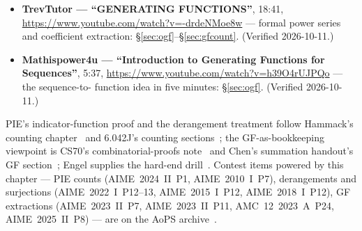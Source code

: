 \begin{rulebox}
\begin{itemize}
\item \textbf{TrevTutor --- ``GENERATING FUNCTIONS''}, 18:41,
\url{https://www.youtube.com/watch?v=-drdeNMoe8w} --- formal power
series and coefficient extraction: \S\ref{sec:ogf}--\S\ref{sec:gfcount}.
(Verified 2026-10-11.)
\item \textbf{Mathispower4u --- ``Introduction to Generating Functions
for Sequences''}, 5:37,
\url{https://www.youtube.com/watch?v=h39O4rUJPQo} --- the sequence-to-
function idea in five minutes: \S\ref{sec:ogf}. (Verified 2026-10-11.)
\end{itemize}
\end{rulebox}

\chapternotes
PIE's indicator-function proof and the derangement treatment follow
Hammack's counting chapter~\cite{hammack} and 6.042J's counting
sections~\cite{mcs}; the GF-as-bookkeeping viewpoint is CS70's
combinatorial-proofs note~\cite{cs70} and Chen's summation handout's GF
section~\cite{chen-summ}; Engel supplies the hard-end drill~\cite{engel}.
Contest items powered by this chapter --- PIE counts (AIME~2024~II~P1,
AIME~2010~I~P7), derangements and surjections (AIME~2022~I~P12--13,
AIME~2015~I~P12, AIME~2018~I~P12), GF extractions (AIME~2023~II~P7,
AIME~2023~II~P11, AMC~12~2023~A~P24, AIME~2025~II~P8) --- are on the
AoPS archive~\cite{aops-amc}.
